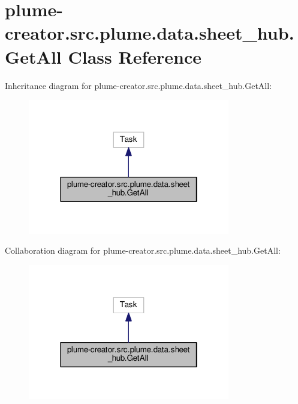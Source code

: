 \hypertarget{classplume-creator_1_1src_1_1plume_1_1data_1_1sheet__hub_1_1_get_all}{}\section{plume-\/creator.src.\+plume.\+data.\+sheet\+\_\+hub.\+Get\+All Class Reference}
\label{classplume-creator_1_1src_1_1plume_1_1data_1_1sheet__hub_1_1_get_all}


Inheritance diagram for plume-\/creator.src.\+plume.\+data.\+sheet\+\_\+hub.\+Get\+All\+:\nopagebreak
\begin{figure}[H]
\begin{center}
\leavevmode
\includegraphics[width=250pt]{classplume-creator_1_1src_1_1plume_1_1data_1_1sheet__hub_1_1_get_all__inherit__graph}
\end{center}
\end{figure}


Collaboration diagram for plume-\/creator.src.\+plume.\+data.\+sheet\+\_\+hub.\+Get\+All\+:\nopagebreak
\begin{figure}[H]
\begin{center}
\leavevmode
\includegraphics[width=250pt]{classplume-creator_1_1src_1_1plume_1_1data_1_1sheet__hub_1_1_get_all__coll__graph}
\end{center}
\end{figure}
